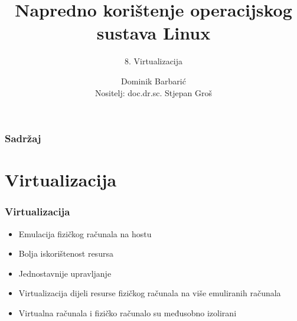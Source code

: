 \documentclass[t]{beamer}
\date{\todayiso}
\title[NKOSL]{Napredno korištenje operacijskog sustava Linux}
\author[Dominik Barbarić]{Dominik Barbarić\\{\small Nositelj: doc.dr.sc. Stjepan Groš}}
\subtitle{8. Virtualizacija}
\institute[FER]{Sveučilište u Zagrebu\\Fakultet elektrotehnike i računarstva}
\begin{document}
	
	{
		\begin{frame}
			\maketitle
		\end{frame}
	}
	
	\begin{frame}
		\frametitle{Sadržaj}
		\tableofcontents
	\end{frame}


\section{Virtualizacija}


\begin{frame}
	\frametitle{Virtualizacija}

	\begin{itemize}
		\item Emulacija fizičkog računala na hostu
		\item Bolja iskorištenost resursa
		\item Jednostavnije upravljanje
	\end{itemize}
	
	\begin{itemize}
		\item Virtualizacija dijeli resurse fizičkog računala na više emuliranih računala
		\item Virtualna računala i fizičko računalo su međusobno izolirani
	\end{itemize}
\end{frame}
\end{document}
